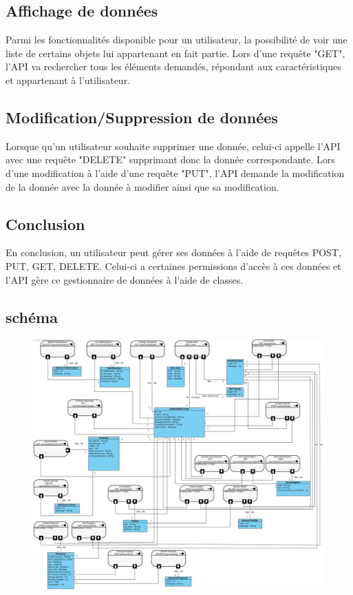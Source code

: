 \subsection{Affichage de données}
\begin{flushleft}
Parmi les fonctionnalités disponible pour un utilisateur, la possibilité de voir une liste de certains objets lui appartenant en fait partie. Lors d'une requête "GET", l'API va rechercher tous les éléments demandés, répondant aux caractéristiques et appartenant à l'utilisateur.
\end{flushleft}

\subsection{Modification/Suppression de données}
\begin{flushleft}
Lorsque qu'un utilisateur souhaite supprimer une donnée, celui-ci appelle l'API avec une requête "DELETE" supprimant donc la donnée correspondante. Lors d'une modification à l'aide d'une requête "PUT", l'API demande la modification de la donnée avec la donnée à modifier ainsi que sa modification.
\end{flushleft}

\subsection{Conclusion}
\begin{flushleft}
En conclusion, un utilisateur peut gérer ses données à l'aide de requêtes POST, PUT, GET, DELETE. Celui-ci a certaines permissions d'accès à ces données et l'API gère ce gestionnaire de données à l'aide de classes.
\newpage

\end{flushleft}
\subsection{schéma}
\begin{figure}[h]
\includegraphics[scale=0.2]{Base/api-rest/img/apirest.jpg}
\end{figure}

